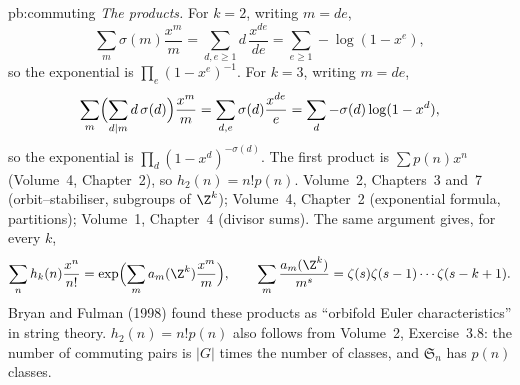 \begin{solution}{pb:commuting}
\emph{The products.} For $k=2$, writing $m=de$,
\[
\sum_m\sigma(m)\frac{x^m}m=\sum_{d,e\ge1}d\,\frac{x^{de}}{de}=\sum_{e\ge1}-\log(1-x^e),
\]
so the exponential is $\prod_e(1-x^e)^{-1}$. For $k=3$, writing $m=de$,
\[
\sum_m\Bigl(\sum_{d\mid m}d\,\sigma(d)\Bigr)\frac{x^m}m=\sum_{d,e}\sigma(d)\frac{x^{de}}e=\sum_d-\sigma(d)\log(1-x^d),
\]
so the exponential is $\prod_d(1-x^d)^{-\sigma(d)}$. The first product is $\sum p(n)x^n$ (Volume~4, Chapter~2), so $h_2(n)=n!p(n)$.
\tools Volume~2, Chapters~3 and~7 (orbit--stabiliser, subgroups of $\Z^k$); Volume~4, Chapter~2 (exponential formula, partitions); Volume~1, Chapter~4 (divisor sums).
\leads The same argument gives, for every $k$,
\[
\sum_nh_k(n)\frac{x^n}{n!}=\exp\Bigl(\sum_ma_m(\Z^k)\frac{x^m}m\Bigr),\qquad\sum_m\frac{a_m(\Z^k)}{m^s}=\zeta(s)\zeta(s-1)\cdots\zeta(s-k+1).
\] Bryan and Fulman (1998) found these products as ``orbifold Euler
characteristics'' in string theory. $h_2(n)=n!p(n)$ also follows from Volume~2, Exercise~3.8: the number of
commuting pairs is $|G|$ times the number of classes, and $\mathfrak S_n$ has $p(n)$ classes.
\end{solution}

